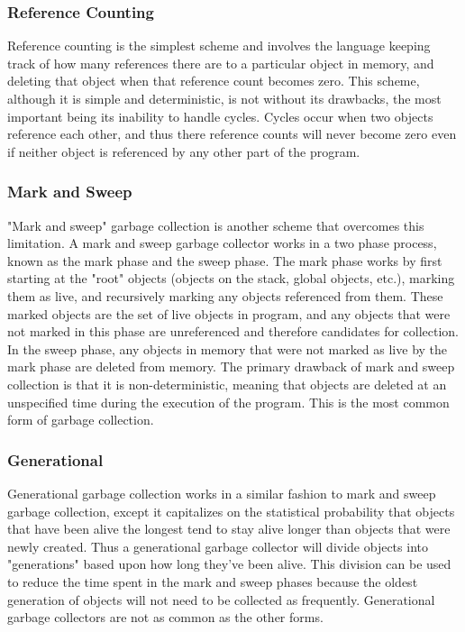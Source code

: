 \documentclass[12pt,a4paper,final,twoside,onecolumn,titlepage]{book}
\begin{document}
\subsubsection{Reference Counting}
Reference counting is the simplest scheme and involves the language keeping track of how many references there are to a particular object in memory, and deleting that object when that reference count becomes zero. This scheme, although it is simple and deterministic, is not without its drawbacks, the most important being its inability to handle cycles. Cycles occur when two objects reference each other, and thus there reference counts will never become zero even if neither object is referenced by any other part of the program.
\subsubsection{Mark and Sweep}
"Mark and sweep" garbage collection is another scheme that overcomes this limitation. A mark and sweep garbage collector works in a two phase process, known as the mark phase and the sweep phase. The mark phase works by first starting at the "root" objects (objects on the stack, global objects, etc.), marking them as live, and recursively marking any objects referenced from them. These marked objects are the set of live objects in program, and any objects that were not marked in this phase are unreferenced and therefore candidates for collection. In the sweep phase, any objects in memory that were not marked as live by the mark phase are deleted from memory. The primary drawback of mark and sweep collection is that it is non-deterministic, meaning that objects are deleted at an unspecified time during the execution of the program. This is the most common form of garbage collection.
\subsubsection{Generational}
Generational garbage collection works in a similar fashion to mark and sweep garbage collection, except it capitalizes on the statistical probability that objects that have been alive the longest tend to stay alive longer than objects that were newly created. Thus a generational garbage collector will divide objects into "generations" based upon how long they've been alive. This division can be used to reduce the time spent in the mark and sweep phases because the oldest generation of objects will not need to be collected as frequently. Generational garbage collectors are not as common as the other forms.
\end{document}
